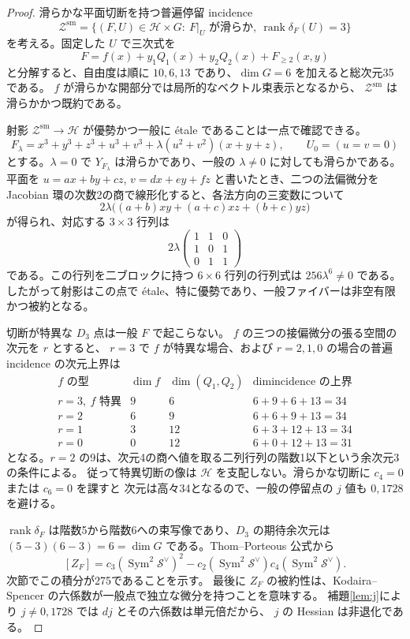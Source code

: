 \documentclass[11pt,a4paper]{ltjsarticle}
\newcommand{\Sym}{\operatorname{Sym}}
\newcommand{\rk}{\operatorname{rank}}
\newcommand{\cH}{\mathcal H}
\newcommand{\cS}{\mathcal S}
\begin{document}
\begin{proof}
滑らかな平面切断を持つ普遍停留 incidence
\[
 \mathcal Z^{\mathrm{sm}}=
 \{(F,U)\in\cH\times G:\ F|_U\text{ が滑らか},\ \rk\delta_F(U)=3\}
\]
を考える。固定した $U$ で三次式を
\[
 F=f(x)+y_1Q_1(x)+y_2Q_2(x)+F_{\ge2}(x,y)
\]
と分解すると、自由度は順に $10,6,13$ であり、$\dim G=6$ を加えると総次元35である。
$f$ が滑らかな開部分では局所的なベクトル束表示となるから、
$\mathcal Z^{\mathrm{sm}}$ は滑らかかつ既約である。

射影 $\mathcal Z^{\mathrm{sm}}\to\cH$ が優勢かつ一般に \'{e}tale であることは一点で確認できる。
\[
 F_\lambda=x^3+y^3+z^3+u^3+v^3+
 \lambda(u^2+v^2)(x+y+z),\qquad U_0=(u=v=0)
\]
とする。$\lambda=0$ で $Y_{F_\lambda}$ は滑らかであり、一般の $\lambda\ne0$ に対しても滑らかである。
平面を $u=ax+by+cz$, $v=dx+ey+fz$ と書いたとき、二つの法偏微分を
Jacobian 環の次数2の商で線形化すると、各法方向の三変数について
\[
 2\lambda\bigl((a+b)xy+(a+c)xz+(b+c)yz\bigr)
\]
が得られ、対応する $3\times3$ 行列は
\[
 2\lambda\begin{pmatrix}1&1&0\\1&0&1\\0&1&1\end{pmatrix}
\]
である。この行列を二ブロックに持つ $6\times6$ 行列の行列式は $256\lambda^6\ne0$ である。
したがって射影はこの点で \'{e}tale、特に優勢であり、一般ファイバーは非空有限かつ被約となる。

切断が特異な $D_3$ 点は一般 $F$ で起こらない。
$f$ の三つの接偏微分の張る空間の次元を $r$ とすると、
$r=3$ で $f$ が特異な場合、および $r=2,1,0$ の場合の普遍 incidence の次元上界は
\[
\begin{array}{c|c|c|c}
 f\text{ の型}&\dim f&\dim(Q_1,Q_2)&\dim\text{incidence の上界}\\\hline
 r=3,\ f\text{ 特異}&9&6&6+9+6+13=34\\
 r=2&6&9&6+6+9+13=34\\
 r=1&3&12&6+3+12+13=34\\
 r=0&0&12&6+0+12+13=31
\end{array}
\]
となる。$r=2$ の9は、次元4の商へ値を取る二列行列の階数1以下という余次元3の条件による。
従って特異切断の像は $\cH$ を支配しない。滑らかな切断に $c_4=0$ または $c_6=0$ を課すと
次元は高々34となるので、一般の停留点の $j$ 値も $0,1728$ を避ける。

$\rk\delta_F$ は階数5から階数6への束写像であり、$D_3$ の期待余次元は
$(5-3)(6-3)=6=\dim G$ である。Thom--Porteous 公式\cite[Theorem 14.4]{Fulton}から
\begin{equation}\label{eq:TP}
 [Z_F]=c_3(\Sym^2\cS^\vee)^2-
 c_2(\Sym^2\cS^\vee)c_4(\Sym^2\cS^\vee).
\end{equation}
次節でこの積分が275であることを示す。
最後に $Z_F$ の被約性は、Kodaira--Spencer の六係数が一般点で独立な微分を持つことを意味する。
補題\ref{lem:j}により $j\ne0,1728$ では $dj$ とその六係数は単元倍だから、
$j$ の Hessian は非退化である。
\end{proof}
\end{document}
